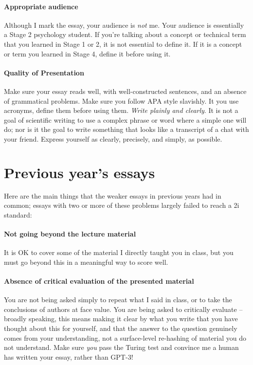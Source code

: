 \documentclass[11pt]{article}
\begin{document}
\paragraph{Appropriate audience} Although I mark the essay, your audience is \emph{not} me. Your audience is essentially a Stage 2 psychology student. If you're talking about a concept or technical term that you learned in Stage 1 or 2, it is not essential to define it. If it is a concept or term you learned in Stage 4, define it before using it.

\paragraph{Quality of Presentation} Make sure your essay reads well, with well-constructed sentences, and an absence of grammatical problems. Make sure you follow APA style slavishly. It you use acronyms, define them before using them. \emph{Write plainly and clearly}. It is not a goal of scientific writing to use a complex phrase or word where a simple one will do; nor is it the goal to write something that looks like a transcript of a chat with your friend.  Express yourself as clearly, precisely, and simply, as possible. 

\section*{Previous year's essays}

Here are the main things that the weaker essays in previous years had in common; essays with two or more of these problems largely failed to reach a 2i standard: 

\paragraph{Not going beyond the lecture material} It is OK to cover some of the
material I directly taught you in class, but you must go beyond this in a
meaningful way to score well.

\paragraph{Absence of critical evaluation of the presented material}
You are not being asked simply to repeat what I said in class, or to take the conclusions of authors at face value. You are being asked to critically evaluate -- broadly speaking, this means making it clear by what you write that you have thought about this for yourself, and that the answer to the question genuinely comes from your understanding, not a surface-level re-hashing of material you do not understand. Make sure \emph{you} pass the Turing test and convince me a human has written your essay, rather than GPT-3! 
\end{document}
